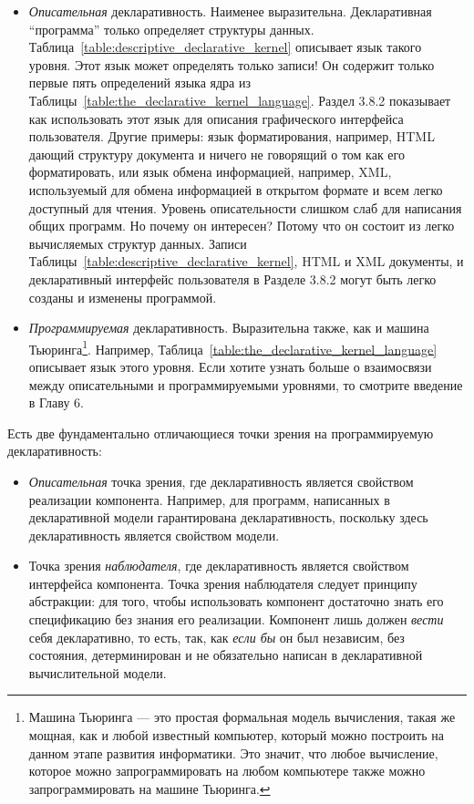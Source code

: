 \begin{itemize}
\item{\emph{Описательная} декларативность. Наименее выразительна. Декларативная ``программа'' только определяет структуры данных. Таблица~\ref{table:descriptive_declarative_kernel} описывает язык такого уровня. Этот язык может определять только записи! Он содержит только первые пять определений языка ядра из Таблицы~\ref{table:the_declarative_kernel_language}. Раздел 3.8.2 показывает как использовать этот язык для описания графического интерфейса пользователя. Другие примеры: язык форматирования, например, HTML дающий структуру документа и ничего не говорящий о том как его форматировать, или язык обмена информацией, например, XML, используемый для обмена информацией в открытом формате и всем легко доступный для чтения. Уровень описательности слишком слаб для написания общих программ. Но почему он интересен? Потому что он состоит из легко вычисляемых структур данных. Записи Таблицы~\ref{table:descriptive_declarative_kernel}, HTML и XML документы, и декларативный интерфейс пользователя в Разделе 3.8.2 могут быть легко созданы и изменены программой.}

\item{\emph{Программируемая} декларативность. Выразительна также, как и машина Тьюринга\footnote{Машина Тьюринга --- это простая формальная модель вычисления, такая же мощная, как и любой известный компьютер, который можно построить на данном этапе развития информатики. Это значит, что любое вычисление, которое можно запрограммировать на любом компьютере также можно запрограммировать на машине Тьюринга.}. Например, Таблица~\ref{table:the_declarative_kernel_language} описывает язык этого уровня. Если хотите узнать больше о взаимосвязи между описательными и программируемыми уровнями, то смотрите введение в Главу 6.}
\end{itemize}

Есть две фундаментально отличающиеся точки зрения на программируемую декларативность:

\begin{itemize}
\item{\emph{Описательная} точка зрения, где декларативность является свойством реализации компонента. Например, для программ, написанных в декларативной модели гарантирована декларативность, поскольку здесь декларативность является свойством модели.}

\item{Точка зрения \emph{наблюдателя}, где декларативность является свойством интерфейса компонента. Точка зрения наблюдателя следует принципу абстракции: для того, чтобы использовать компонент достаточно знать его спецификацию без знания его реализации. Компонент лишь должен \emph{вести} себя декларативно, то есть, так, как \emph{если бы} он был независим, без состояния, детерминирован и не обязательно написан в декларативной вычислительной модели.}
\end{itemize}

